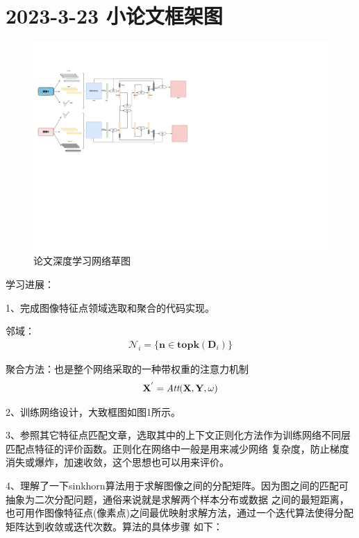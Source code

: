 \documentclass[10pt,a4paper]{article}
\begin{document}
\tableofcontents %
\newpage

\section{2023-3-23 小论文框架图}

\begin{figure}[!htb]
\includegraphics[width=\hsize]{images/论文框图.pdf}
\caption{论文深度学习网络草图}
\end{figure}

学习进展：

1、完成图像特征点领域选取和聚合的代码实现。

邻域：
\begin{align}
   \mathcal{N}_i=\{\mathbf{n}\in \mathbf{topk}(\mathbf{D}_i)\}
\end{align}

聚合方法：也是整个网络采取的一种带权重的注意力机制
\begin{align}
   \mathbf{X}^{'}=\mathbf{\emph{Att}}(\mathbf{X},\mathbf{Y},\mathbf{\omega}) 
\end{align}

2、训练网络设计，大致框图如图1所示。

3、参照其它特征点匹配文章，选取其中的上下文正则化方法作为训练网络不同层匹配点特征的评价函数。正则化在网络中一般是用来减少网络
复杂度，防止梯度消失或爆炸，加速收敛，这个思想也可以用来评价。

4、理解了一下sinkhorn算法用于求解图像之间的分配矩阵。因为图之间的匹配可抽象为二次分配问题，通俗来说就是求解两个样本分布或数据
之间的最短距离，也可用作图像特征点(像素点)之间最优映射求解方法，通过一个迭代算法使得分配矩阵达到收敛或迭代次数。算法的具体步骤
如下：
\end{document}
